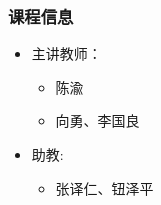 %
%
\begin{frame}
    \frametitle{课程信息}
    \begin{itemize}
        \item 主讲教师：
        \begin{itemize}
            \item 陈渝
            \item 向勇、李国良
        \end{itemize}
        
        \item 助教: 
        \begin{itemize}
            \item 张译仁、钮泽平
        \end{itemize}
    \end{itemize}
\end{frame}

